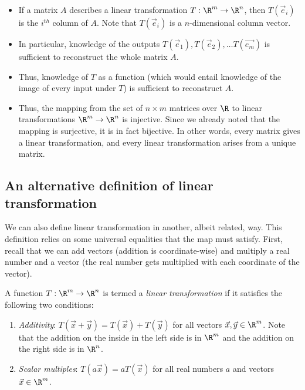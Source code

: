 \documentclass[10pt]{amsart}
\begin{document}
\begin{itemize}
\item If a matrix $A$ describes a linear transformation $T: \R^m \to
  \R^n$, then $T(\vec{e}_i)$ is the $i^{th}$ column of $A$. Note that
  $T(\vec{e}_i)$ is a $n$-dimensional column vector.
\item In particular, knowledge of the outputs $T(\vec{e}_1),
  T(\vec{e}_2), \dots T(\vec{e_m})$ is sufficient to reconstruct the
  whole matrix $A$.
\item Thus, knowledge of $T$ as a function (which would entail
  knowledge of the image of every input under $T$) is sufficient to
  reconstruct $A$.
\item Thus, the mapping from the set of $n \times m$ matrices over
  $\R$ to linear transformations $\R^m \to \R^n$ is injective. Since
  we already noted that the mapping is surjective, it is in fact
  bijective. In other words, every matrix gives a linear
  transformation, and every linear transformation arises from a unique
  matrix.
\end{itemize}

\subsection{An alternative definition of linear transformation}

We can also define linear transformation in another, albeit related,
way. This definition relies on some universal equalities that the map
must satisfy. First, recall that we can add vectors (addition is
coordinate-wise) and multiply a real number and a vector (the real
number gets multiplied with each coordinate of the vector).

\begin{definer}
  A function $T:\R^m \to \R^n$ is termed a {\em linear transformation}
  if it satisfies the following two conditions:

  \begin{enumerate}
  \item {\em Additivity}: $T(\vec{x} + \vec{y}) = T(\vec{x}) +
    T(\vec{y})$ for all vectors $\vec{x},\vec{y} \in \R^m$. Note that
    the addition on the inside in the left side is in $\R^m$ and the
    addition on the right side is in $\R^n$.
  \item {\em Scalar multiples}: $T(a\vec{x}) = aT(\vec{x})$ for all
    real numbers $a$ and vectors $\vec{x} \in \R^m$.
  \end{enumerate}
\end{definer}
\end{document}
